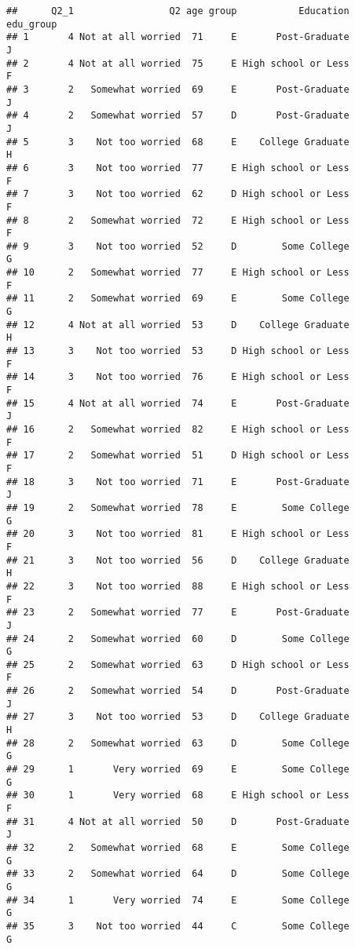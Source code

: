 \documentclass[
]{article}
\begin{document}
\begin{verbatim}
##      Q2_1                 Q2 age group           Education edu_group
## 1       4 Not at all worried  71     E       Post-Graduate         J
## 2       4 Not at all worried  75     E High school or Less         F
## 3       2   Somewhat worried  69     E       Post-Graduate         J
## 4       2   Somewhat worried  57     D       Post-Graduate         J
## 5       3    Not too worried  68     E    College Graduate         H
## 6       3    Not too worried  77     E High school or Less         F
## 7       3    Not too worried  62     D High school or Less         F
## 8       2   Somewhat worried  72     E High school or Less         F
## 9       3    Not too worried  52     D        Some College         G
## 10      2   Somewhat worried  77     E High school or Less         F
## 11      2   Somewhat worried  69     E        Some College         G
## 12      4 Not at all worried  53     D    College Graduate         H
## 13      3    Not too worried  53     D High school or Less         F
## 14      3    Not too worried  76     E High school or Less         F
## 15      4 Not at all worried  74     E       Post-Graduate         J
## 16      2   Somewhat worried  82     E High school or Less         F
## 17      2   Somewhat worried  51     D High school or Less         F
## 18      3    Not too worried  71     E       Post-Graduate         J
## 19      2   Somewhat worried  78     E        Some College         G
## 20      3    Not too worried  81     E High school or Less         F
## 21      3    Not too worried  56     D    College Graduate         H
## 22      3    Not too worried  88     E High school or Less         F
## 23      2   Somewhat worried  77     E       Post-Graduate         J
## 24      2   Somewhat worried  60     D        Some College         G
## 25      2   Somewhat worried  63     D High school or Less         F
## 26      2   Somewhat worried  54     D       Post-Graduate         J
## 27      3    Not too worried  53     D    College Graduate         H
## 28      2   Somewhat worried  63     D        Some College         G
## 29      1       Very worried  69     E        Some College         G
## 30      1       Very worried  68     E High school or Less         F
## 31      4 Not at all worried  50     D       Post-Graduate         J
## 32      2   Somewhat worried  68     E        Some College         G
## 33      2   Somewhat worried  64     D        Some College         G
## 34      1       Very worried  74     E        Some College         G
## 35      3    Not too worried  44     C        Some College         G

\end{verbatim}
\end{document}

